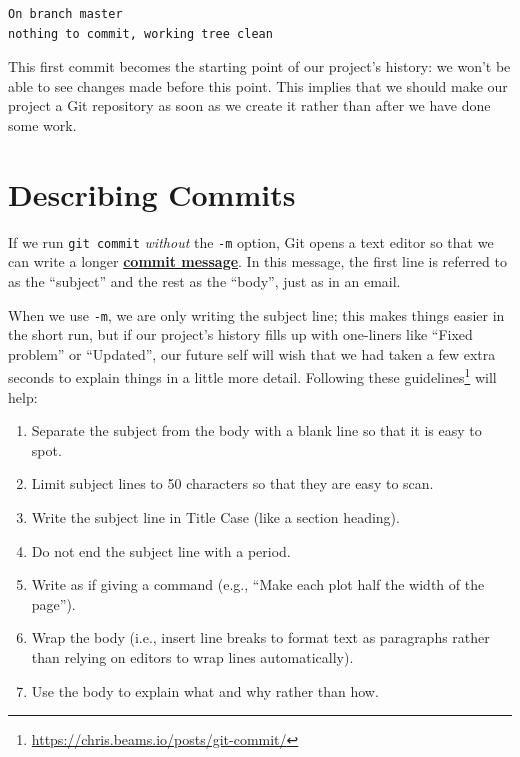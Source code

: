 \documentclass[
]{krantz}
\providecommand{\tightlist}{%
  \setlength{\itemsep}{0pt}\setlength{\parskip}{0pt}}
\renewcommand{\href}[2]{#2\footnote{\url{#1}}}
\newcommand{\gref}[2]{\hyperlink{#2}{\textbf{#1}}}
\begin{document}
\begin{verbatim}
On branch master
nothing to commit, working tree clean
\end{verbatim}

This first commit becomes the starting point of our project's history:
we won't be able to see changes made before this point.
This implies that we should make our project a Git repository
as soon as we create it
rather than after we have done some work.

\hypertarget{git-cmdline-commit-message}{%
\section{Describing Commits}\label{git-cmdline-commit-message}}

If we run \texttt{git\ commit} \emph{without} the \texttt{-m} option,
Git opens a text editor
so that we can write a longer \gref{commit message}{commit\_message}.
In this message,
the first line is referred to as the ``subject''
and the rest as the ``body'',
just as in an email.

When we use \texttt{-m},
we are only writing the subject line;
this makes things easier in the short run,
but if our project's history fills up with one-liners like
``Fixed problem'' or ``Updated'',
our future self will wish that we had taken a few extra seconds
to explain things in a little more detail.
Following \href{https://chris.beams.io/posts/git-commit/}{these guidelines} will help:

\begin{enumerate}
\def\labelenumi{\arabic{enumi}.}
\tightlist
\item
  Separate the subject from the body with a blank line
  so that it is easy to spot.
\item
  Limit subject lines to 50 characters so that they are easy to scan.
\item
  Write the subject line in Title Case (like a section heading).
\item
  Do not end the subject line with a period.
\item
  Write as if giving a command
  (e.g., ``Make each plot half the width of the page'').
\item
  Wrap the body
  (i.e., insert line breaks to format text as paragraphs
  rather than relying on editors to wrap lines automatically).
\item
  Use the body to explain what and why rather than how.
\end{enumerate}
\end{document}
